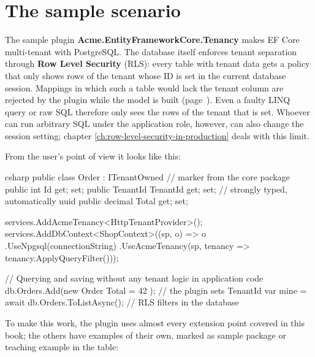 \chapter{The sample scenario}\label{ch:the-sample-scenario}

The sample plugin \textbf{Acme.EntityFrameworkCore.Tenancy} makes EF Core multi-tenant with
PostgreSQL. The database itself enforces tenant separation through \textbf{Row Level
Security} (RLS): every table with tenant data gets a policy that only shows rows of the tenant
whose ID is set in the current database session. Mappings in which such a table would lack the
tenant column are rejected by the plugin while the model is built
(page~\pageref{sec:supported-table-mappings}). Even a faulty LINQ query or raw SQL therefore
only sees the rows of the tenant that is set. Whoever can run arbitrary SQL under the
application role, however, can also change the session setting; chapter
\ref{ch:row-level-security-in-production} deals with this limit.

From the user's point of view it looks like this:

\begin{sourcecode}{csharp}
public class Order : ITenantOwned               // marker from the core package
{
    public int Id { get; set; }
    public TenantId TenantId { get; set; }      // strongly typed, automatically uuid
    public decimal Total { get; set; }
}

services.AddAcmeTenancy<HttpTenantProvider>();
services.AddDbContext<ShopContext>((sp, o) => o
    .UseNpgsql(connectionString)
    .UseAcmeTenancy(sp, tenancy => tenancy.ApplyQueryFilter()));

// Querying and saving without any tenant logic in application code
db.Orders.Add(new Order { Total = 42 });         // the plugin sets TenantId
var mine = await db.Orders.ToListAsync();        // RLS filters in the database
\end{sourcecode}

To make this work, the plugin uses almost every extension point covered in this book; the
others have examples of their own, marked as sample package or teaching example in the table:

